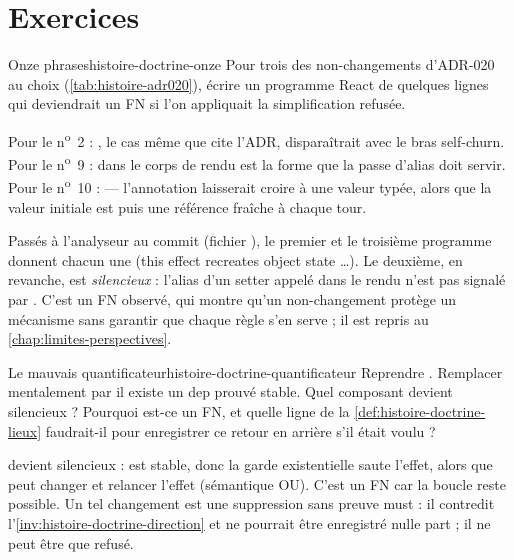 \section{Exercices}
\label{sec:histoire-doctrine-exercices}

\begin{exercice}{Onze phrases}{histoire-doctrine-onze}
Pour trois des non-changements d'ADR-020 au choix (\cref{tab:histoire-adr020}), écrire un programme React de quelques lignes qui deviendrait un FN si l'on appliquait la simplification refusée.
\end{exercice}
\begin{solution}
Pour le n\textsuperscript{o}~2 : , le cas même que cite l'ADR, disparaîtrait avec le bras self-churn. Pour le n\textsuperscript{o}~9 :  dans le corps de rendu est la forme que la passe d'alias doit servir. Pour le n\textsuperscript{o}~10 :  --- l'annotation laisserait croire à une valeur typée, alors que la valeur initiale est  puis une référence fraîche à chaque tour.

Passés à l'analyseur au commit  (fichier ), le premier et le troisième programme donnent chacun une \Error{}  (\og this effect recreates object state \dots\fg{}). Le deuxième, en revanche, est \emph{silencieux} : l'alias  d'un setter appelé dans le rendu n'est pas signalé par . C'est un FN observé, qui montre qu'un non-changement protège un mécanisme sans garantir que chaque règle s'en serve ; il est repris au \cref{chap:limites-perspectives}.
\end{solution}

\begin{exercice}{Le mauvais quantificateur}{histoire-doctrine-quantificateur}
Reprendre . Remplacer mentalement  par \og il existe un dep prouvé stable\fg{}. Quel composant devient silencieux ? Pourquoi est-ce un FN, et quelle ligne de la \cref{def:histoire-doctrine-lieux} faudrait-il pour enregistrer ce retour en arrière s'il était voulu ?
\end{exercice}
\begin{solution}
 devient silencieux :  est stable, donc la garde \og existentielle\fg{} saute l'effet, alors que  peut changer et relancer l'effet (sémantique OU). C'est un FN car la boucle reste possible. Un tel changement est une suppression sans preuve must : il contredit l'\cref{inv:histoire-doctrine-direction} et ne pourrait être enregistré nulle part ; il ne peut être que refusé.
\end{solution}

